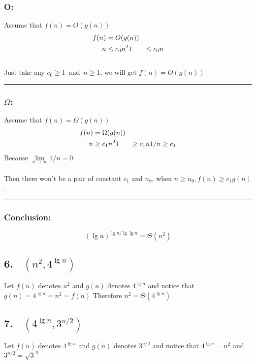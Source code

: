 \documentclass[oneside]{homework} %
\begin{document}
\subsubsection* {O:}
Assume that $f(n) = O(g(n))$\\
\begin{equation}
\notag
\begin{aligned}[b]
f(n) &= O(g(n)) \\
n  & \leq c_{0}n^2  
1  & \leq c_{0}n 
\end{aligned}
\end{equation}
\\ Just take any $ c_{0} \geq 1 $~and~$n\geq 1$, we will get $f(n) = O(g(n))$ 
\\ \rule{3mm}{3mm}

\subsubsection* {$\Omega$:}
Assume that $f(n) = \Omega (g(n))$\\
\begin{equation}
\notag
\begin{aligned}[b]
f(n) &= \Omega(g(n)) \\
n & \geq c_{1}n^2  
1 & \geq c_{1}n  
1/n \geq c_{1}
\end{aligned}
\end{equation}
Because $\lim\limits_{n\to\infty} 1/n  = 0$.\\
\\Then there won't be a pair of constant $c_{1}$ and $n_{0}$, when $n \geq n_{0} , f(n) \geq c_{1}g(n) $.
\\ \rule{3mm}{3mm}

\subsubsection* {Conclusion:}
$$(\lg n)^{\lg n / \lg \lg n} = \Theta(n^2)$$


\subsection*{6. ~$(n^2,4^{\lg n})$}
Let $f(n)$ denotes $n^2$ and $g(n)$ denotes $4^{\lg n}$ and notice that $g(n) = 4^{\lg n} = n^2 = f(n)$
Therefore $n^2 = \Theta (4^{\lg n})$

\subsection*{7. ~$(4^{\lg n},3^{n/2})$}
Let $f(n)$ denotes $4^{\lg n}$ and $g(n)$ denotes $3^{n/2}$ and notice that $4^{\lg n} = n^2$ and $3^{n/2} = \sqrt{3}^n$
\end{document}
